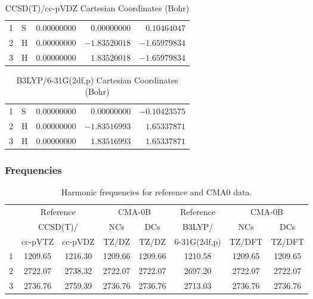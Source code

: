 \documentclass[10pt,oneside]{article}
\begin{document}
\begin{table}[h!]
\centering
\caption{CCSD(T)/cc-pVDZ Cartesian Coordinates (Bohr)}
\begin{tabular}{llrrr}
1  & S  & $ 0.00000000$ & $ 0.00000000$ & $ 0.10464047$ \\
2  & H  & $ 0.00000000$ & $-1.83520018$ & $-1.65979834$ \\
3  & H  & $ 0.00000000$ & $ 1.83520018$ & $-1.65979834$ \\
\end{tabular}
\end{table}

\begin{table}[h!]
\centering
\caption{B3LYP/6-31G(2df,p) Cartesian Coordinates (Bohr)}
\begin{tabular}{llrrr}
1  & S  & $ 0.00000000$ & $ 0.00000000$ & $-0.10423575$ \\
2  & H  & $ 0.00000000$ & $-1.83516993$ & $ 1.65337871$ \\
3  & H  & $ 0.00000000$ & $ 1.83516993$ & $ 1.65337871$ \\
\end{tabular}
\end{table}

\clearpage

\subsubsection*{Frequencies}
\begin{table}[h!]
\centering
\caption{Harmonic frequencies for reference and CMA0 data.}
\begin{tabular}{cccccccc}
\toprule
{} & \multicolumn{2}{c}{Reference} & \multicolumn{2}{c}{CMA-0B} &    Reference & \multicolumn{2}{c}{CMA-0B} \\
{} & \multicolumn{2}{c}{CCSD(T)/} &     NCs &     DCs &       B3LYP/ &     NCs &     DCs \\
{} &   cc-pVTZ & cc-pVDZ &   TZ/DZ &   TZ/DZ & 6-31G(2df,p) &  TZ/DFT &  TZ/DFT \\
\midrule
1 &   1209.65 & 1216.30 & 1209.66 & 1209.66 &      1210.58 & 1209.65 & 1209.65 \\
2 &   2722.07 & 2738.32 & 2722.07 & 2722.07 &      2697.20 & 2722.07 & 2722.07 \\
3 &   2736.76 & 2759.39 & 2736.76 & 2736.76 &      2713.03 & 2736.76 & 2736.76 \\
\bottomrule
\end{tabular}
\end{table}
\end{document}
